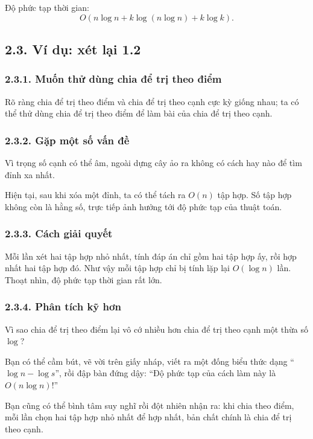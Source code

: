\documentclass[11pt]{article}
\begin{document}
Độ phức tạp thời gian:
\[
  O(n\log n+k\log(n\log n)+k\log k).
\]

\subsection*{2.3. Ví dụ: xét lại 1.2}

\subsubsection*{2.3.1. Muốn thử dùng chia để trị theo điểm}

Rõ ràng chia để trị theo điểm và chia để trị theo cạnh cực kỳ giống nhau; ta
có thể thử dùng chia để trị theo điểm để làm bài của chia để trị theo cạnh.

\subsubsection*{2.3.2. Gặp một số vấn đề}

Vì trọng số cạnh có thể âm, ngoài dựng cây ảo ra không có cách hay nào để tìm
đỉnh xa nhất.

Hiện tại, sau khi xóa một đỉnh, ta có thể tách ra \(O(n)\) tập hợp. Số tập
hợp không còn là hằng số, trực tiếp ảnh hưởng tới độ phức tạp của thuật toán.

\subsubsection*{2.3.3. Cách giải quyết}

Mỗi lần xét hai tập hợp nhỏ nhất, tính đáp án chỉ gồm hai tập hợp ấy, rồi hợp
nhất hai tập hợp đó. Như vậy mỗi tập hợp chỉ bị tính lặp lại \(O(\log n)\)
lần. Thoạt nhìn, độ phức tạp thời gian rất lớn.

\subsubsection*{2.3.4. Phân tích kỹ hơn}

Vì sao chia để trị theo điểm lại vô cớ nhiều hơn chia để trị theo cạnh một
thừa số \(\log\)?

Bạn có thể cầm bút, vẽ vời trên giấy nháp, viết ra một đống biểu thức dạng
``\(\log n-\log s\)'', rồi đập bàn đứng dậy: ``Độ phức tạp của cách làm này
là \(O(n\log n)\)!''

Bạn cũng có thể bình tâm suy nghĩ rồi đột nhiên nhận ra: khi chia theo điểm,
mỗi lần chọn hai tập hợp nhỏ nhất để hợp nhất, bản chất chính là chia để trị
theo cạnh.
\end{document}
